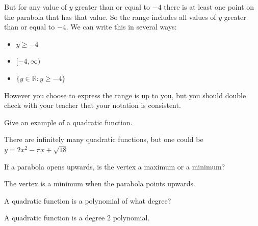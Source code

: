 \documentclass[12pt,fleqn]{book}
\newcommand{\prb}[1]{\begin{Exercise}#1\end{Exercise}}
\newcommand{\sol}[1]{\begin{Answer}#1\end{Answer}}
\begin{document}
But for any value of $y$ greater than or equal to $-4$ there is at least one point on the parabola that has that value.  So the range includes all values of $y$ greater than or equal to $-4$.  We can write this in several ways:
\begin{itemize}
	\item $y\ge -4$
	\item $[-4,\infty)$
	\item $\{y\in \mathbb R : y \ge -4\}$
\end{itemize}
However you choose to express the range is up to you, but you should double check with your teacher that your notation is consistent.
\prb{Give an example of a quadratic function.}\vspace{4em}
\sol{There are infinitely many quadratic functions, but one could be $y=2x^2-\pi x + \sqrt{18}$}
\prb{If a parabola opens upwards, is the vertex a maximum or a minimum?}\vspace{4em}
\sol{The vertex is a minimum when the parabola points upwards.}
\prb{A quadratic function is a polynomial of what degree?}
\vspace{4em}
\sol{A quadratic function is a degree 2 polynomial.}
\clearpage
\end{document}
